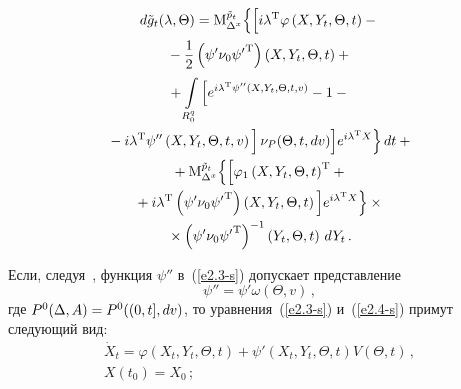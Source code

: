 \begin{multicols}{2}
\noindent
    \begin{multline}
    d\tilde{g}_t (\lambda,\Theta) =
    \mm_{\Delta^x}^{\tilde{p}_t} \Big\{
     \Big[ 
i \lambda^{\mathrm{T}} \varphi 
    \left( X,Y_t,\Theta, t\right) -{}\\
    {}- \fr{1}{2} \left(\psi'\nu_0{\psi'}^{\mathrm{T}}\right) 
    \left( X,Y_t,\Theta, t\right)+{}\\
{}+ \int\limits_{R_0^q} \left[ e^{i\lambda^{\mathrm{T}} \psi'' 
\left( X,Y_t,\Theta, t,v\right)} -1- {}\right.\\
\left.{}-i\lambda^{\mathrm{T}} \psi'' 
\left( X,Y_t,\Theta, t,v\right)
\vphantom{e^{i\lambda^{\mathrm{T}} \psi'' 
\left( X,Y_t,\Theta, t,v\right)}}
\right] \nu_P (\Theta, t, dv)\Big] 
e^{i\lambda^{\mathrm{T}} X} \Big\}\,dt +{}\\
  {}+ \mm_{\Delta^x}^{\tilde{p}_t} \Big\{ \Big[ 
  \varphi_1 \left( X,Y_t,\Theta, t\right)^{\mathrm{T}} + {}\\
  {}+
  i\lambda^{\mathrm{T}} \left(\psi'\nu_0 {\psi'}^{\mathrm{T}}\right) 
  \left( X,Y_t,\Theta, t\right)\Big] 
  e^{i\lambda^{\mathrm{T}} X}\Big\} \times{}\\
  {}\times
  \left(\psi'\nu_0{\psi'}^{\mathrm{T}}\right)^{-1}
  \left( Y_t,\Theta, t\right)\, dY_t\,.
  \label{e2.6-s}
  \end{multline}

Если, следуя~\cite{8-s}, функция $\psi''$ в~(\ref{e2.3-s}) допускает представление
\begin{equation*}
\psi'' = \psi' \omega (\Theta, v)\,,
\end{equation*}
где  $P^0 (\Delta, A) \hm= P^0 ((0,t], dv)$, то уравнения~(\ref{e2.3-s}) 
и~(\ref{e2.4-s}) примут следующий вид:
\begin{multline}
\dot X_t =\varphi \left(X_t, Y_t, \Theta, t\right)+\psi' 
\left(X_t, Y_t, \Theta, t\right)V(\Theta, t)\,,\\ X\left(t_0\right)=X_0\,;
\label{e2.8-s}
\end{multline}

\vspace*{-12pt}


\end{multicols}
